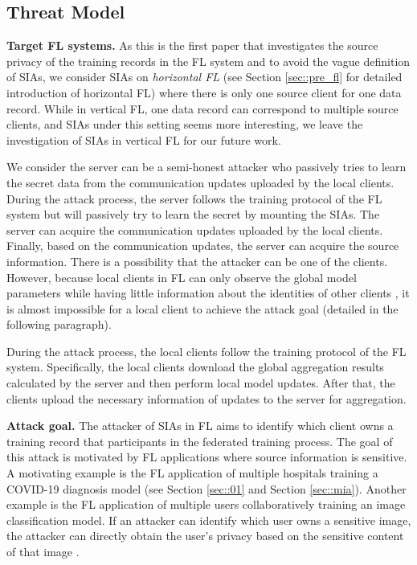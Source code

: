 \documentclass[10pt,journal,compsoc]{IEEEtran}
\begin{document}
\subsection{Threat Model}
{
\noindent \textbf{Target FL systems.} As this is the first paper that investigates the source privacy of the training records in the FL system and to avoid the vague definition of SIAs, we consider SIAs on \textit{horizontal FL} (see Section \ref{sec::pre_fl} for detailed introduction of horizontal FL) where there is only one source client for one data record. While in vertical FL, one data record can correspond to multiple source clients, and SIAs under this setting seems more interesting, we leave the investigation of SIAs in vertical FL for our future work.} 

{
We consider the server can be a semi-honest attacker who passively tries to learn the secret data from the communication updates uploaded by the local clients. During the attack process, the server follows the training protocol of the FL system but will passively try to learn the secret by mounting the SIAs. The server can acquire the communication updates uploaded by the local clients. Finally, based on the communication updates, the server can acquire the source information. There is a possibility that the attacker can be one of the clients. However, because local clients in FL can only observe the global model parameters while having little information about the identities of other clients \cite{lyu2022privacy}, it is almost impossible for a local client to achieve the attack goal (detailed in the following paragraph).}


{During the attack process, the local clients follow the training protocol of the FL system. Specifically, the local clients download the global aggregation results calculated by the server and then perform local model updates. After that, the clients upload the necessary information of updates to the server for aggregation.
}


\noindent \textbf{Attack goal.} The attacker of SIAs in FL aims to identify which client owns a training record that participants in the federated training process. The goal of this attack is motivated by FL applications where source information is sensitive. A motivating example is the FL application of multiple hospitals training a COVID-19 diagnosis model (see Section \ref{sec::01} and Section \ref{sec::mia}). Another example is the FL application of multiple users collaboratively training an image classification model. If an attacker can identify which user owns a sensitive image, the attacker can directly obtain the user's privacy based on the sensitive content of that image \cite{melis2019exploiting}.
\end{document}
